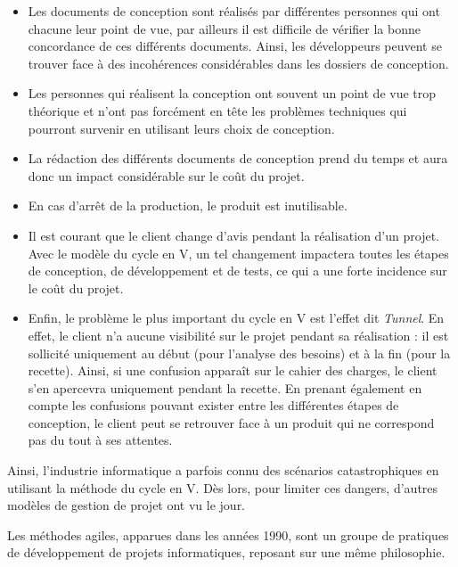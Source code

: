 \begin{itemize}

\item Les documents de conception sont réalisés par différentes personnes qui ont chacune leur point de vue, par ailleurs il est difficile de vérifier la bonne concordance de ces différents documents. Ainsi, les développeurs peuvent se trouver face à des incohérences considérables dans les dossiers de conception.

\item Les personnes qui réalisent la conception ont souvent un point de vue trop théorique et n'ont pas forcément en tête les problèmes techniques qui pourront survenir en utilisant leurs choix de conception.

\item La rédaction des différents documents de conception prend du temps et aura donc un impact considérable sur le coût du projet.

\item En cas d'arrêt de la production, le produit est inutilisable.

\item Il est courant que le client change d'avis pendant la réalisation d'un projet. Avec le modèle du cycle en V, un tel changement impactera toutes les étapes de conception, de développement et de tests, ce qui a une forte incidence sur le coût du projet.

\item Enfin, le problème le plus important du cycle en V est l'effet dit \textit{Tunnel}. En effet, le client n'a aucune visibilité sur le projet pendant sa réalisation : il est sollicité uniquement au début (pour l'analyse des besoins) et à la fin (pour la recette). Ainsi, si une confusion apparaît sur le cahier des charges, le client s'en apercevra uniquement pendant la recette. En prenant également en compte les confusions pouvant exister entre les différentes étapes de conception, le client peut se retrouver face à un produit qui ne correspond pas du tout à ses attentes.\\

\end{itemize}

Ainsi, l'industrie informatique a parfois connu des scénarios catastrophiques en utilisant la méthode du cycle en V. Dès lors, pour limiter ces dangers, d'autres modèles de gestion de projet ont vu le jour.

Les méthodes agiles, apparues dans les années 1990, sont un groupe de pratiques de développement de projets informatiques, reposant sur une même philosophie.

